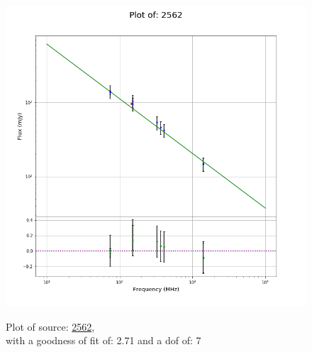 \documentclass{article}
\begin{document}
\begin{figure}[H]
    \centering
    \begin{minipage}{.5\textwidth}
        \centering
        \includegraphics[scale = 0.35]{KmeulenTrap4P23_1hr/1hr2562.png}
        \captionsetup{labelformat=empty}
        \caption{Plot of source: \href{http://banana.transientskp.org/r4/vlo_KmeulenTrap4P23/runningcatalog/2562}{2562},\\with a goodness of fit of: 2.71 and a dof of: 7}
        \addtocounter{figure}{-1}
        \label{KmeulenTrap4P23:1hr:2562:plot}
    \end{minipage}%
    \begin{minipage}{0.5\textwidth}
        \centering


\end{minipage}
\end{figure}
\end{document}
